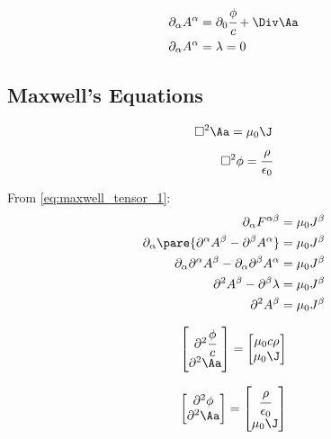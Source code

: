  \begin{align}
    \partial_\alpha A^{\alpha} &= \partial_0 \cfrac{\phi}{c} + \Div \Aa \\
    \partial_\alpha A^{\alpha} &= \lambda = 0
  \end{align}


\subsection{Maxwell's Equations}

  \begin{align}
    \square^2 \Aa = \mu_0 \J \\
    \square^2 \phi = \cfrac{\rho}{\epsilon_0}
  \end{align}


  From \autoref{eq:maxwell_tensor_1}:
  \begin{align}
    \partial_\alpha F^{\alpha\beta} &= \mu_0J^\beta \\
    \partial_\alpha\pare{\partial^\alpha A^\beta - \partial^\beta A^\alpha} &= \mu_0J^\beta \\
    \partial_\alpha\partial^\alpha A^\beta - \partial_\alpha \partial^\beta A^\alpha &= \mu_0J^\beta \\
    \partial^2 A^\beta - \partial^\beta \lambda &= \mu_0J^\beta \\
    \partial^2 A^\beta &= \mu_0J^\beta
  \end{align}

  \begin{align}
    \begin{bmatrix}
      \partial^2\cfrac{\phi}{c} \\ \partial^2\Aa
    \end{bmatrix}
    =
    \begin{bmatrix}
      \mu_0 c \rho \\ \mu_0 \J
    \end{bmatrix}
  \end{align}

  \begin{align}
    \begin{bmatrix}
      \partial^2 \phi \\ \partial^2\Aa
    \end{bmatrix}
    =
    \begin{bmatrix}
      \cfrac{\rho}{\epsilon_0} \\ \mu_0 \J
    \end{bmatrix}
  \end{align}
